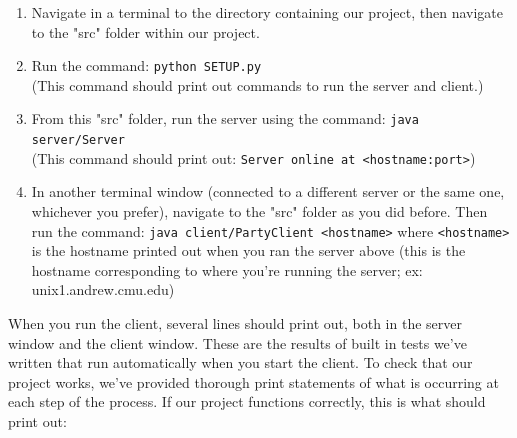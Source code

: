 \documentclass[12pt]{article}
\begin{document}
\begin{enumerate}
	\item{Navigate in a terminal to the directory containing our project, then navigate to the "src" folder within our project.}
	\item{Run the command: \verb|python SETUP.py| \\ (This command should print out commands to run the server and client.)}
	\item{From this "src" folder, run the server using the command: \verb|java server/Server| \\ (This command should print out: \verb|Server online at <hostname:port>|)}
	\item{In another terminal window (connected to a different server or the same one, whichever you prefer), navigate to the "src" folder as you did before. Then run the command: \verb|java client/PartyClient <hostname>| where \verb|<hostname>| is the hostname printed out when you ran the server above (this is the hostname corresponding to where you're running the server; ex: unix1.andrew.cmu.edu)}
\end{enumerate}

When you run the client, several lines should print out, both in the server window and the client window. These are the results of built in tests we've written that run automatically when you start the client. To check that our project works, we've provided thorough print statements of what is occurring at each step of the process. If our project functions correctly, this is what should print out:
\end{document}
